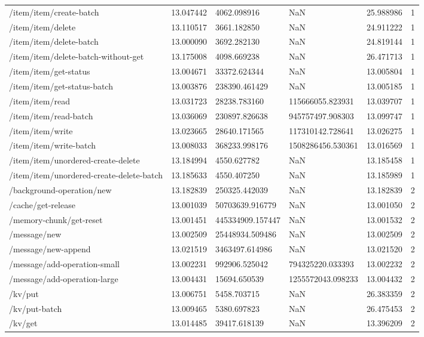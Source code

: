 \begin{tabularx}{\linewidth}{XXXXXX}
/item/item/create-batch & 13.047442 & 4062.098916 & NaN & 25.988986 & 1 \\
/item/item/delete & 13.110517 & 3661.182850 & NaN & 24.911222 & 1 \\
/item/item/delete-batch & 13.000090 & 3692.282130 & NaN & 24.819144 & 1 \\
/item/item/delete-batch-without-get & 13.175008 & 4098.669238 & NaN & 26.471713 & 1 \\
/item/item/get-status & 13.004671 & 33372.624344 & NaN & 13.005804 & 1 \\
/item/item/get-status-batch & 13.003876 & 238390.461429 & NaN & 13.005185 & 1 \\
/item/item/read & 13.031723 & 28238.783160 & 115666055.823931 & 13.039707 & 1 \\
/item/item/read-batch & 13.036069 & 230897.826638 & 945757497.908303 & 13.099747 & 1 \\
/item/item/write & 13.023665 & 28640.171565 & 117310142.728641 & 13.026275 & 1 \\
/item/item/write-batch & 13.008033 & 368233.998176 & 1508286456.530361 & 13.016569 & 1 \\
/item/item/unordered-create-delete & 13.184994 & 4550.627782 & NaN & 13.185458 & 1 \\
/item/item/unordered-create-delete-batch & 13.185633 & 4550.407250 & NaN & 13.185989 & 1 \\
/background-operation/new & 13.182839 & 250325.442039 & NaN & 13.182839 & 2 \\
/cache/get-release & 13.001039 & 50703639.916779 & NaN & 13.001050 & 2 \\
/memory-chunk/get-reset & 13.001451 & 445334909.157447 & NaN & 13.001532 & 2 \\
/message/new & 13.002509 & 25448934.509486 & NaN & 13.002509 & 2 \\
/message/new-append & 13.021519 & 3463497.614986 & NaN & 13.021520 & 2 \\
/message/add-operation-small & 13.002231 & 992906.525042 & 794325220.033393 & 13.002232 & 2 \\
/message/add-operation-large & 13.004431 & 15694.650539 & 1255572043.098233 & 13.004432 & 2 \\
/kv/put & 13.006751 & 5458.703715 & NaN & 26.383359 & 2 \\
/kv/put-batch & 13.009465 & 5380.697823 & NaN & 26.475453 & 2 \\
/kv/get & 13.014485 & 39417.618139 & NaN & 13.396209 & 2 \\

\end{tabularx}
